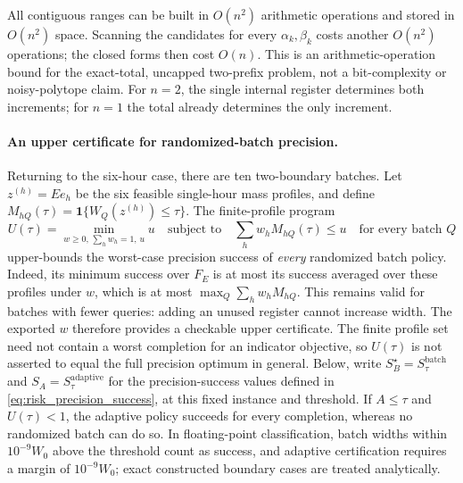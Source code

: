 \documentclass[12pt]{article}
\begin{document}
All contiguous ranges can be built in $O(n^2)$ arithmetic operations
and stored in $O(n^2)$ space. Scanning the candidates for every
$\alpha_k,\beta_k$ costs another $O(n^2)$ operations; the closed forms
then cost $O(n)$. This is an arithmetic-operation bound for the exact-total,
uncapped two-prefix problem, not a bit-complexity or noisy-polytope claim.
For $n=2$, the single internal register determines both increments;
for $n=1$ the total already determines the only increment.


\paragraph{An upper certificate for randomized-batch precision.}
Returning to the six-hour case, there are ten two-boundary batches.
Let $z^{(h)}=Ee_h$ be the six feasible
single-hour mass profiles, and define
$M_{hQ}(\tau)=\mathbf1\{W_Q(z^{(h)})\leq\tau\}$.
The finite-profile program
\begin{equation}
 U(\tau)=\min_{w\geq0,\,\sum_hw_h=1,\,u}u
 \quad\text{subject to}\quad
 \sum_hw_hM_{hQ}(\tau)\leq u\quad\text{for every batch }Q
 \label{eq:counter-precision-upper}
\end{equation}
upper-bounds the worst-case precision success of \emph{every} randomized
batch policy. Indeed, its minimum success over $F_E$ is at most its success
averaged over these profiles under $w$, which is at most
$\max_Q\sum_hw_hM_{hQ}$. This remains valid for batches with fewer queries:
adding an unused register cannot increase width. The exported $w$ therefore
provides a checkable upper certificate. The finite profile set need not
contain a worst completion for an indicator objective, so $U(\tau)$ is not
asserted to equal the full precision optimum in general. Below, write
$S_B^\star=S_\tau^{\mathrm{batch}}$ and
$S_A=S_\tau^{\mathrm{adaptive}}$ for the precision-success values defined
in \eqref{eq:risk_precision_success}, at this fixed instance and threshold.
If $A\leq\tau$ and $U(\tau)<1$, the adaptive policy succeeds for every
completion, whereas no randomized batch can do so. In floating-point
classification, batch widths within $10^{-9}W_0$ above the threshold count
as success, and adaptive certification requires a margin of
$10^{-9}W_0$; exact constructed boundary cases are treated analytically.
\end{document}
